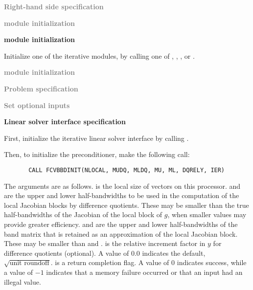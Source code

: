 \begin{Steps}
  
\item \textcolor{gray}{\bf Right-hand side specification}

\item \textcolor{gray}{\bf {\nvector} module initialization}

\item {\bf {\sunlinsol} module initialization}

  Initialize one of the iterative {\sunlinsol} modules, by calling one
  of , , ,
   or .

\item \textcolor{gray}{\bf {\sunnonlinsol} module initialization}

\item \textcolor{gray}{\bf Problem specification}

\item \textcolor{gray}{\bf Set optional inputs}

\item {\bf Linear solver interface specification}

  First, initialize the {\cvls} iterative linear solver interface
  by calling .

  Then, to initialize the {\cvbbdpre} preconditioner, make the following call:
\begin{verbatim}
       CALL FCVBBDINIT(NLOCAL, MUDQ, MLDQ, MU, ML, DQRELY, IER)
\end{verbatim}
  The arguments are as follows.
   is the local size of vectors on this processor.
   and  are the upper and lower half-bandwidths to be used in 
  the computation of the local Jacobian blocks by difference quotients.
  These may be smaller than the true half-bandwidths of the
  Jacobian of the local block of $g$, when smaller values may
  provide greater efficiency.
   and  are the upper and lower half-bandwidths of the band matrix
  that  is retained as an approximation of the local Jacobian block.
  These may be smaller than  and .
   is the relative increment factor in $y$ for difference quotients
  (optional).  A value of $0.0$ indicates the default, $\sqrt{\text{unit roundoff}}$.
   is a return completion flag.  A value of $0$ indicates success, while
  a value of $-1$ indicates that a memory failure occurred or that an input had
  an illegal value.
    

\end{Steps}
